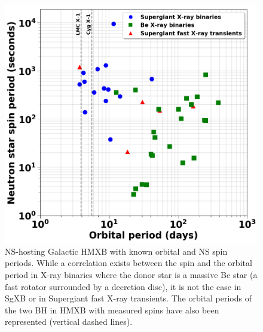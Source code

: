 \documentclass[letterpaper,12pt,onecolumn]{article}
\makeatletter
\newcommand{\sgx}{SgXB\xspace}
\newcommand*{\hmxb}{HMXB\@\xspace}
\newcommand*{\ns}{NS\@\xspace}
\newcommand*{\bh}{BH\@\xspace}
\makeatother
\begin{document}
\begin{figure}[!t]
\centering
\includegraphics[width=0.7\columnwidth]{Figures/corbet_diag.png}
\caption{\ns-hosting Galactic \hmxb with known orbital and \ns spin periods. While a correlation exists between the spin and the orbital period in X-ray binaries where the donor star is a massive Be star (a fast rotator surrounded by a decretion disc), it is not the case in \sgx or in Supergiant fast X-ray transients. The orbital periods of the two \bh in \hmxb with measured spins have also been represented (vertical dashed lines).}
\label{fig:spin}
\end{figure} 





\end{document}
